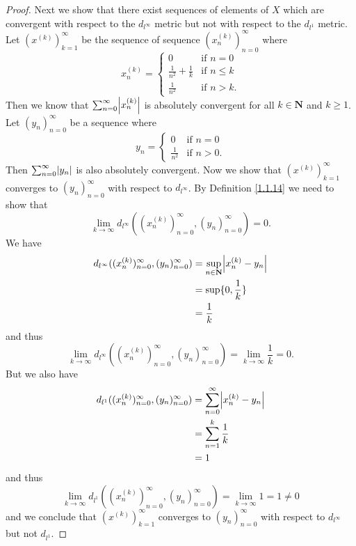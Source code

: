 \begin{proof}
    Next we show that there exist sequences of elements of \(X\) which are convergent with respect to the \(d_{l^\infty}\) metric but not with respect to the \(d_{l^1}\) metric.
    Let \((x^{(k)})_{k = 1}^\infty\) be the sequence of sequence \((x_n^{(k)})_{n = 0}^\infty\) where
    \[
        x_n^{(k)} = \begin{cases}
            0                           & \text{if } n = 0    \\
            \frac{1}{n^2} + \frac{1}{k} & \text{if } n \leq k \\
            \frac{1}{n^2}               & \text{if } n > k.
        \end{cases}
    \]
    Then we know that \(\sum_{n = 0}^\infty \abs*{x_n^{(k)}}\) is absolutely convergent for all \(k \in \mathbf{N}\) and \(k \geq 1\).
    Let \((y_n)_{n = 0}^\infty\) be a sequence where
    \[
        y_n = \begin{cases}
            0             & \text{if } n = 0  \\
            \frac{1}{n^2} & \text{if } n > 0.
        \end{cases}
    \]
    Then \(\sum_{n = 0}^\infty \abs*{y_n}\) is also absolutely convergent.
    Now we show that \((x^{(k)})_{k = 1}^\infty\) converges to \((y_n)_{n = 0}^\infty\) with respect to \(d_{l^\infty}\).
    By Definition \ref{1.1.14} we need to show that
    \[
        \lim_{k \to \infty} d_{l^\infty}((x_n^{(k)})_{n = 0}^\infty, (y_n)_{n = 0}^\infty) = 0.
    \]
    We have
    \begin{align*}
        d_{l^\infty}((x_n^{(k)})_{n = 0}^\infty, (y_n)_{n = 0}^\infty) & = \sup_{n \in \mathbf{N}} \abs*{x_n^{(k)} - y_n} \\
                                                                       & = \sup \{0, \frac{1}{k}\}                        \\
                                                                       & = \frac{1}{k}
    \end{align*}
    and thus
    \[
        \lim_{k \to \infty} d_{l^\infty}((x_n^{(k)})_{n = 0}^\infty, (y_n)_{n = 0}^\infty) = \lim_{k \to \infty} \frac{1}{k} = 0.
    \]
    But we also have
    \begin{align*}
        d_{l^1}((x_n^{(k)})_{n = 0}^\infty, (y_n)_{n = 0}^\infty) & = \sum_{n = 0}^\infty \abs*{x_n^{(k)} - y_n} \\
                                                                  & = \sum_{n = 1}^k \frac{1}{k}                 \\
                                                                  & = 1
    \end{align*}
    and thus
    \[
        \lim_{k \to \infty} d_{l^1}((x_n^{(k)})_{n = 0}^\infty, (y_n)_{n = 0}^\infty) = \lim_{k \to \infty} 1 = 1 \neq 0
    \]
    and we conclude that \((x^{(k)})_{k = 1}^\infty\) converges to \((y_n)_{n = 0}^\infty\) with respect to \(d_{l^\infty}\) but not \(d_{l^1}\).


\end{proof}
